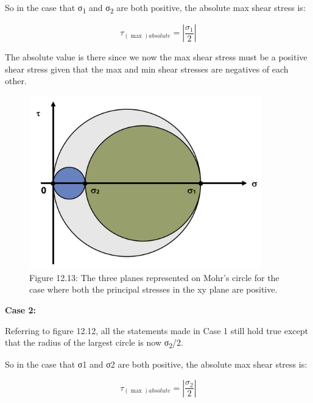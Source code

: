 \documentclass[
  letterpaper,
  DIV=11,
  numbers=noendperiod]{scrreprt}
\theoremstyle{definition}
\theoremstyle{remark}
\begin{document}
So in the case that σ\textsubscript{1} and σ\textsubscript{2} are both
positive, the absolute max shear stress is:

\[
\tau_{(\max )absolute}=\left|\frac{\sigma_1}{2}\right|
\]

The absolute value is there since we now the max shear stress must be a
positive shear stress given that the max and min shear stresses are
negatives of each other.

\begin{figure}[H]

{\centering \includegraphics[width=3.96875in,height=\textheight]{images/CH12 figures/figure 12.13.png}

}

\caption{Figure 12.13: The three planes represented on Mohr's circle for
the case where both the principal stresses in the xy plane are
positive.}

\end{figure}%

\textbf{Case 2:}

Referring to figure 12.12, all the statements made in Case 1 still hold
true except that the radius of the largest circle is now
σ\textsubscript{2}/2.

So in the case that σ1 and σ2 are both positive, the absolute max shear
stress is:

\[
\tau_{(\max )absolute}=\left|\frac{\sigma_2}{2}\right|
\]
\end{document}
